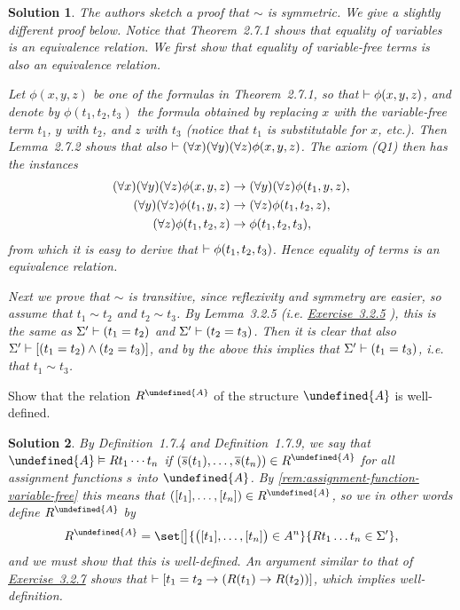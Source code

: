 \documentclass[article, a4paper, 11pt, oneside]{memoir}
\let\mathfrak\undefined
\numberwithin{equation}{chapter}
\newcommand{\frakA}{\mathfrak{A}}
\renewenvironment{exerciseframed}[1][]{%
    \setsepchar{.}%
    \readlist*\mylist{#1}%
    \def\smalllabel{\mylist[2].\mylist[3]}%
    \refstepcounter{exerciseframed}%
    \begin{exerciseframed*}[#1]%
    \label{ex:#1}%
}{%
    \end{exerciseframed*}%
}
\newcommand{\RNum}[1]{\uppercase\expandafter{\romannumeral #1\relax}}
\newcommand{\exref}[1]{%
    \hyperref[ex:#1]{Exercise~#1}%
}
\theoremstyle{nonumberplain}
\newtheorem{solution}{Solution}
\begin{document}
\begin{solution}
    The authors sketch a proof that $\sim$ is symmetric. We give a slightly different proof below. Notice that Theorem~2.7.1 shows that equality of \emph{variables} is an equivalence relation. We first show that equality of \emph{variable-free terms} is also an equivalence relation. %
    
    Let $\phi(x,y,z)$ be one of the formulas in Theorem~2.7.1, so that $\vdash \phi(x,y,z)$, and denote by $\phi(t_1,t_2,t_3)$ the formula obtained by replacing $x$ with the variable-free term $t_1$, $y$ with $t_2$, and $z$ with $t_3$ (notice that $t_1$ is substitutable for $x$, etc.). Then Lemma~2.7.2 shows that also $\vdash (\forall x) (\forall y) (\forall z) \phi(x,y,z)$. The axiom (Q1) then has the instances
    \begin{align*}
        (\forall x) (\forall y) (\forall z) \phi(x,y,z)
            &\rightarrow (\forall y) (\forall z) \phi(t_1,y,z), \\
        (\forall y) (\forall z) \phi(t_1,y,z)
            &\rightarrow (\forall z) \phi(t_1,t_2,z), \\
        (\forall z) \phi(t_1,t_2,z)
            &\rightarrow \phi(t_1,t_2,t_3),
    \end{align*}
    from which it is easy to derive that $\vdash \phi(t_1,t_2,t_3)$. Hence equality of terms is an equivalence relation.

    Next we prove that $\sim$ is transitive, since reflexivity and symmetry are easier, so assume that $t_1 \sim t_2$ and $t_2 \sim t_3$. By Lemma~3.2.5 (i.e. \exref{3.2.5}), this is the same as $\Sigma' \vdash (t_1 = t_2)$ and $\Sigma' \vdash (t_2 = t_3)$. Then it is clear that also $\Sigma' \vdash [(t_1 = t_2) \land (t_2 = t_3)]$, and by the above this implies that $\Sigma' \vdash (t_1 = t_3)$, i.e. that $t_1 \sim t_3$.
\end{solution}


\begin{exerciseframed}[3.2.8]
    Show that the relation $R^\frakA$ of the structure $\frakA$ is well-defined.
\end{exerciseframed}

\begin{solution}
    By Definition~1.7.4 and Definition~1.7.9, we say that $\frakA \models Rt_1 \cdots t_n$ if $(\overline{s}(t_1), \ldots, \overline{s}(t_n)) \in R^\frakA$ for all assignment functions $s$ into $\frakA$. By \cref{rem:assignment-function-variable-free} this means that $([t_1], \ldots, [t_n]) \in R^\frakA$, so we in other words define $R^\frakA$ by
    \begin{equation*}
        R^\frakA
            = \set[\big]{ \bigl( [t_1], \ldots, [t_n] \bigr) \in A^n }{ Rt_1 \ldots t_n \in \Sigma' },
    \end{equation*}
    and we must show that this is well-defined. An argument similar to that of \exref{3.2.7} shows that $\vdash [t_1 = t_2 \rightarrow (R(t_1) \rightarrow R(t_2))]$, which implies well-definition.
\end{solution}
\end{document}
